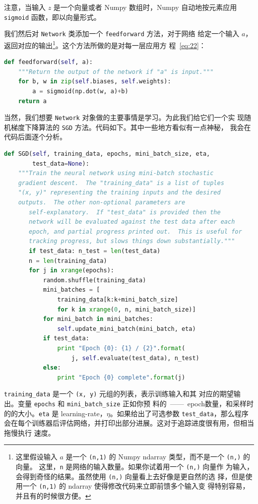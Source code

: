 注意，当输入 $z$ 是一个向量或者 Numpy 数组时，Numpy 自动地按元素应用
\lstinline!sigmoid! 函数，即以向量形式。

我们然后对 \lstinline!Network! 类添加一个 \lstinline!feedforward! 方法，对于网络
给定一个输入 $a$，返回对应的输出\footnote{这里假设输入 $a$ 是一个
  \lstinline!(n,1)! 的 Numpy ndarray 类型，而不是一个 \lstinline!(n,)! 的向量。
  这里，\lstinline!n! 是网络的输入数量。如果你试着用一个 \lstinline!(n,)! 向量作
  为输入，会得到奇怪的结果。虽然使用 \lstinline!(n,)! 向量看上去好像是更自然的选
  择，但是使用一个 \lstinline!(n,1)! 的 ndarray 使得修改代码来立即前馈多个输入变
  得特别容易，并且有的时候很方便。}。这个方法所做的是对每一层应用方
程~\eqref{eq:22}：
\begin{lstlisting}[language=Python]
def feedforward(self, a):
    """Return the output of the network if "a" is input."""
    for b, w in zip(self.biases, self.weights):
        a = sigmoid(np.dot(w, a)+b)
    return a
\end{lstlisting}

当然，我们想要 \lstinline!Network! 对象做的主要事情是学习。为此我们给它们一个实
现随机梯度下降算法的 \lstinline!SGD! 方法。代码如下。其中一些地方看似有一点神秘，
我会在代码后面逐个分析。
\begin{lstlisting}[language=Python]
def SGD(self, training_data, epochs, mini_batch_size, eta,
        test_data=None):
    """Train the neural network using mini-batch stochastic
    gradient descent.  The "training_data" is a list of tuples
    "(x, y)" representing the training inputs and the desired
    outputs.  The other non-optional parameters are
       self-explanatory.  If "test_data" is provided then the
       network will be evaluated against the test data after each
       epoch, and partial progress printed out.  This is useful for
       tracking progress, but slows things down substantially."""
       if test_data: n_test = len(test_data)
       n = len(training_data)
       for j in xrange(epochs):
           random.shuffle(training_data)
           mini_batches = [
               training_data[k:k+mini_batch_size]
               for k in xrange(0, n, mini_batch_size)]
           for mini_batch in mini_batches:
               self.update_mini_batch(mini_batch, eta)
           if test_data:
               print "Epoch {0}: {1} / {2}".format(
                   j, self.evaluate(test_data), n_test)
           else:
               print "Epoch {0} complete".format(j)
\end{lstlisting}

\lstinline!training_data! 是一个 \lstinline!(x, y)! 元组的列表，表示训练输入和其
对应的期望输出。变量 \lstinline!epochs! 和 \lstinline!mini_batch_size! 正如你预
料的~——~\gls*{epoch}数量，和采样时的\minibatch{}的大小。\lstinline!eta! 是%
\gls*{learning-rate}，$\eta$。如果给出了可选参数 \lstinline!test_data!，那么程序
会在每个训练器后评估网络，并打印出部分进展。这对于追踪进度很有用，但相当拖慢执行
速度。

